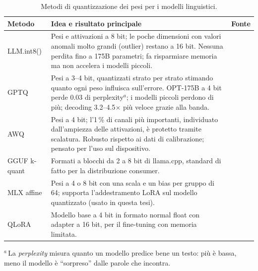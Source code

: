 \begin{table}[htbp]
\centering
\caption{Metodi di quantizzazione dei pesi per i modelli linguistici.}
\label{tab:local-quant}
\small
\begin{tabularx}{\textwidth}{@{}lXl@{}}
\toprule
Metodo & Idea e risultato principale & Fonte \\
\midrule
LLM.int8() & Pesi e attivazioni a 8 bit; le poche dimensioni con valori anomali molto grandi (outlier) restano a 16 bit. Nessuna
perdita fino a 175B parametri; fa risparmiare memoria ma non accelera i modelli piccoli. & \cite{dettmers2022llmint8} \\
GPTQ & Pesi a 3--4 bit, quantizzati strato per strato stimando quanto ogni peso influisca sull'errore. OPT-175B a 4 bit
perde 0.03 di perplexity$^{a}$; i modelli piccoli perdono di più; decoding 3.2--4.5$\times$ più veloce grazie alla banda. & \cite{frantar2023gptq} \\
AWQ & Pesi a 4 bit; l'1\,\% di canali più importanti, individuato dall'ampiezza delle attivazioni, è protetto tramite
scalatura. Robusto rispetto ai dati di calibrazione; pensato per l'uso sul dispositivo. & \cite{lin2024awq} \\
GGUF k-quant & Formati a blocchi da 2 a 8 bit di llama.cpp, standard di fatto per la distribuzione consumer. & \cite{llamacpp} \\
MLX affine & Pesi a 4 o 8 bit con una scala e un bias per gruppo di 64; supporta l'addestramento LoRA sul modello
quantizzato (usato in questa tesi). & \cite{mlxlm} \\
QLoRA & Modello base a 4 bit in formato normal float con adapter a 16 bit, per il fine-tuning con memoria limitata. &
\cite{dettmers2023qlora} \\
\bottomrule
\end{tabularx}

\smallskip
{\footnotesize\raggedright $^{a}$\,La \emph{perplexity} misura quanto un modello predice bene un testo: più è bassa, meno
il modello è ``sorpreso'' dalle parole che incontra.\par}
\end{table}

